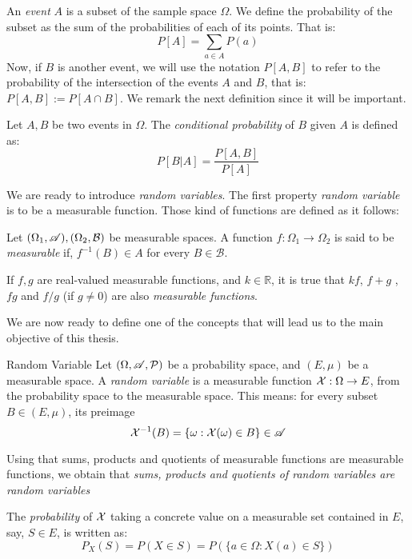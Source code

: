 An \emph{event} $A$ is a subset of the sample space $\Omega$. We define the probability of the subset as the sum of the probabilities of each of its points. That is:
$$
P[A] = \sum_{a \in A}P(a)
$$
Now, if $B$ is another event, we will use the notation $P[A,B]$ to refer to the probability of the intersection of the events $A$ and $B$, that is: $P[A,B] := P[A\cap B]$. We remark the next definition since it will be important.

\begin{ndef}
Let $A,B$ be two events in $\Omega$. The \emph{conditional probability} of $B$ given $A$ is defined as:
$$
P[B|A] = \frac{P[A,B]}{P[A]}
$$
\end{ndef}


We are ready to introduce \emph{random variables}. The first property \emph{random variable} is to be a measurable function. Those kind of functions are defined as it follows:

\begin{ndef}
Let $(\Omega_1, \mathscr{A}),(\Omega_2, \mathcal B)$ be measurable spaces. A function $f: \Omega_1 \to \Omega_2$ is said to be \emph{measurable} if, $f^{-1}(B) \in A$ for every $B \in \mathcal B$.
\end{ndef}

If $f,g$ are real-valued measurable functions, and $k \in \mathbb R$, it is true that $kf$, $f+g$ , $fg$ and $f/g$ (if $g \ne 0$) are also \emph{measurable functions}.



We are now ready to define one of the concepts that will lead us to the main objective of this thesis.

\begin{ndef}{Random Variable}
Let $(\Omega,\mathscr{A},\mathcal{P})$ be a probability space, and $(E,\mu)$ be a measurable space. 
A \emph{random variable} is a measurable function $\mathcal{X}: \Omega \to E$, from the probability space to the measurable space. This means: for every subset $B \in (E,\mu)$, its preimage
$$
\mathcal{X}^{-1}(B) = \{\omega : \mathcal{X}(\omega) \in B\} \in \mathscr{A}
$$
\end{ndef}

Using that sums, products and quotients of measurable functions are measurable functions, we obtain that \emph{sums, products and quotients of random variables are random variables}

The \emph{probability} of $\mathcal{X}$ taking a concrete value on a measurable set contained in $E$, say, $S \in E$, is written as:
$$
P_X(S) = P(X \in S) = P(\{a \in \Omega : X(a) \in S\})
$$

